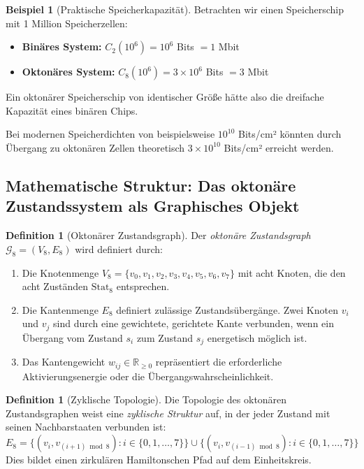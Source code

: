 \documentclass[12pt, a4paper]{article}
\theoremstyle{definition}
\newtheorem{definition}[theorem]{Definition}
\newtheorem{example}[theorem]{Beispiel}
\theoremstyle{remark}
\newcommand{\R}{\mathbb{R}}
\newcommand{\Graph}{\mathcal{G}}
\newcommand{\Stat}{\mathrm{Stat}}
\begin{document}
\begin{example}[Praktische Speicherkapazität]
Betrachten wir einen Speicherschip mit 1 Million Speicherzellen:
\begin{itemize}
  \item \textbf{Binäres System:} $C_2(10^6) = 10^6$ Bits $= 1$ Mbit
  \item \textbf{Oktonäres System:} $C_8(10^6) = 3 \times 10^6$ Bits $= 3$ Mbit
\end{itemize}
Ein oktonärer Speicherschip von identischer Größe hätte also die dreifache Kapazität eines binären Chips.

Bei modernen Speicherdichten von beispielsweise $10^{10}$ Bits/cm² könnten durch Übergang zu oktonären Zellen theoretisch $3 \times 10^{10}$ Bits/cm² erreicht werden.
\end{example}

\subsection{Mathematische Struktur: Das oktonäre Zustandssystem als Graphisches Objekt}
\label{subsec:oktonaere_graphstruktur}

\begin{definition}[Oktonärer Zustandsgraph]
\label{def:oktonaerer_zustandsgraph}
Der \emph{oktonäre Zustandsgraph} $\Graph_8 = (V_8, E_8)$ wird definiert durch:
\begin{enumerate}[label=(\alph*)]
  \item Die Knotenmenge $V_8 = \{v_0, v_1, v_2, v_3, v_4, v_5, v_6, v_7\}$ mit acht Knoten, die den acht Zuständen $\Stat_8$ entsprechen.
  \item Die Kantenmenge $E_8$ definiert zulässige Zustandsübergänge. Zwei Knoten $v_i$ und $v_j$ sind durch eine gewichtete, gerichtete Kante verbunden, wenn ein Übergang vom Zustand $s_i$ zum Zustand $s_j$ energetisch möglich ist.
  \item Das Kantengewicht $w_{ij} \in \R_{\geq 0}$ repräsentiert die erforderliche Aktivierungsenergie oder die Übergangswahrscheinlichkeit.
\end{enumerate}
\end{definition}

\begin{definition}[Zyklische Topologie]
\label{def:zyklische_topologie}
Die Topologie des oktonären Zustandsgraphen weist eine \emph{zyklische Struktur} auf, in der jeder Zustand mit seinen Nachbarstaaten verbunden ist:
\[
E_8 = \{(v_i, v_{(i+1) \bmod 8}) : i \in \{0,1,\ldots,7\}\} \cup \{(v_i, v_{(i-1) \bmod 8}) : i \in \{0,1,\ldots,7\}\}
\]
Dies bildet einen zirkulären Hamiltonschen Pfad auf dem Einheitskreis.
\end{definition}
\end{document}
